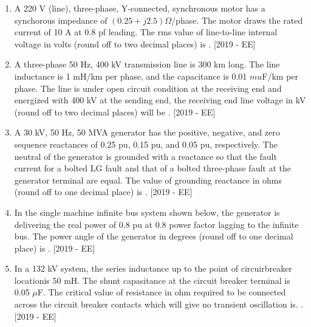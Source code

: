\documentclass[journal]{IEEEtran}
\begin{document}
\begin{enumerate}
\item A 220 V (line), three-phase, Y-connected, synchronous motor has a synchorous impedance of $(0.25 + j2.5)\Omega$/phase. The motor draws the rated current of 10 A at 0.8 pf leading. The rms value of line-to-line internal voltage in volts (round off to two decimal places) is \underline{\hspace{3cm}}. \hfill{[2019 - EE]}
\item A three-phase 50 Hz, 400 kV transmission line is 300 km long. The line inductance is 1 mH/km per phase, and the capacitance is 0.01 $mu$F/km per phase. The line is under open circuit condition at the receiving end and energized with 400 kV at the sending end, the receiving end line voltage in kV (round off to two decimal places) will be \underline{\hspace{3cm}}. \hfill{[2019 - EE]}
\item A 30 kV, 50 Hz, 50 MVA generator has the positive, negative, and zero sequence reactances of 0.25 pu, 0.15 pu, and 0.05 pu, respectively. The neutral of the generator is grounded with a reactance so that the fault current for a bolted LG fault and that of a bolted three-phase fault at the generator terminal are equal. The value of grounding reactance in ohms (round off to one decimal place) is \underline{\hspace{3cm}}. \hfill{[2019 - EE]}
\item In the single machine infinite bus system shown below, the generator is delivering the real power of 0.8 pu at 0.8 power factor lagging to the infinite bus. The power angle of the generator in degrees (round off to one decimal place) is \underline{\hspace{3cm}}. \hfill{[2019 - EE]}
    \begin{center}
        
    \end{center}
    \item In a 132 kV system, the series inductance up to the point of circuirbreaker locationis 50 mH. The shunt capasitance at the circuit breaker terminal is 0.05 $\mu$F. The critical value of resistance in ohm required to be connected across the circuit breaker contacts which will give no transient oscillation is. \underline{\hspace{3cm}}.\hfill{[2019 - EE]}
\end{enumerate}
\end{document}
